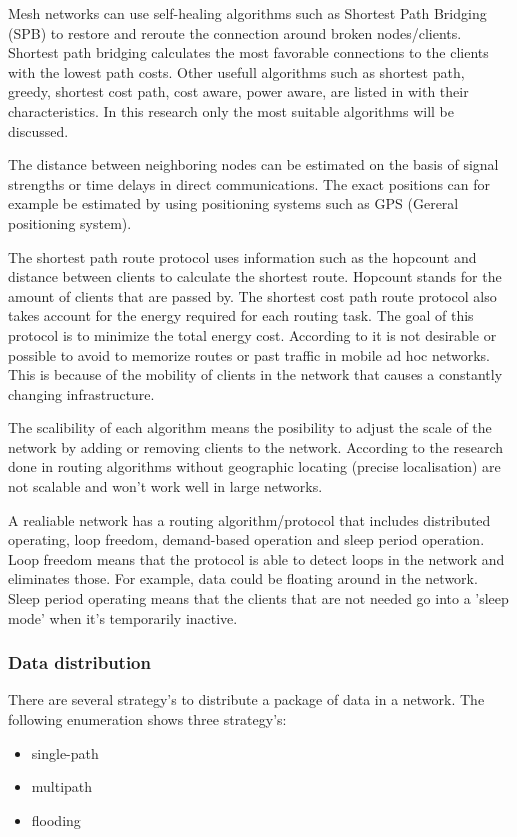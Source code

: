 \documentclass[10pt,a4paper]{article}
\begin{document}
Mesh networks can use self-healing algorithms such as Shortest Path Bridging (SPB) to restore and reroute the connection around broken nodes/clients. Shortest path bridging calculates the most favorable connections to the clients with the lowest path costs. \cite{SPB} Other usefull algorithms such as shortest path, greedy, shortest cost path, cost aware, power aware, are listed in \cite{position-based} with their characteristics. In this research only the most suitable algorithms will be discussed. 

The distance between neighboring nodes can be estimated on the basis of signal strengths or time delays in direct communications. The exact positions can for example be estimated by using positioning systems such as GPS (Gereral positioning system). \cite{locationsystemsforubiquitouscomputing} 


The shortest path route protocol uses information such as the hopcount and distance between clients to calculate the shortest route. Hopcount stands for the amount of clients that are passed by. The shortest cost path route protocol also takes account for the energy required for each routing task. The goal of this protocol is to minimize the total energy cost. According to \cite{position-based} it is not desirable or possible to avoid to memorize routes or past traffic in mobile ad hoc networks. This is because of the mobility of clients in the network that causes a constantly changing infrastructure.


The scalibility of each algorithm means the posibility to adjust the scale of the network by adding or removing clients to the network. According to the research done in \cite{geographicalrouting}\cite{scalablelocation} routing algorithms without geographic locating (precise localisation) are not scalable and won't work well in large networks. 

A realiable network has a routing algorithm/protocol that includes distributed operating, loop freedom, demand-based operation and sleep period operation. Loop freedom means that the protocol is able to detect loops in the network and eliminates those. For example, data could be floating around in the network. Sleep period operating means that the clients that are not needed go into a 'sleep mode' when it's temporarily inactive.\cite{position-based}


\subsubsection{Data distribution}
There are several strategy's to distribute a package of data in a network. The following enumeration shows three strategy's:
\begin{itemize}
\setlength\itemsep{0em}
    \item single-path
    \item multipath
    \item flooding
\end{itemize}
\end{document}

